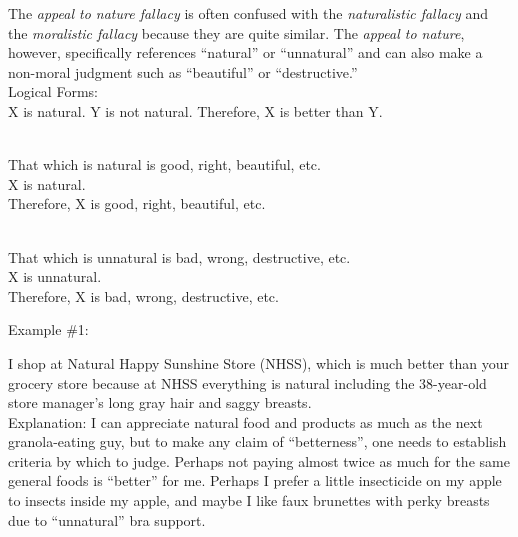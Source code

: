 \documentclass[a4paper,12pt,single,pdftex]{scrartcl}
\begin{document}
    
      The {\it appeal to nature fallacy} is often confused with the {\it naturalistic fallacy} and the {\it moralistic fallacy} because they are quite similar. The {\it appeal to nature}, however, specifically references “natural” or “unnatural” and can also make a non-moral judgment such as “beautiful” or “destructive.”
    \\

    
      Logical Forms:
    \\

    
      X is natural. \newline
Y is not natural. \newline
Therefore, X is better than Y. \newline
 \newline

    \\

    
      That which is natural is good, right, beautiful, etc.
    \\

    
      X is natural.
    \\

    
      Therefore, X is good, right, beautiful, etc. \newline
 \newline

    \\

    
      That which is unnatural is bad, wrong, destructive, etc.
    \\

    
      X is unnatural.
    \\

    
      Therefore, X is bad, wrong, destructive, etc.
    \\

    
       \newline

      Example \#1: \newline
 \newline


      
        I shop at Natural Happy Sunshine Store (NHSS), which is much better than your grocery store because at NHSS everything is natural including the 38-year-old store manager’s long gray hair and saggy breasts.
      \\

      
        Explanation: I can appreciate natural food and products as much as the next granola-eating guy, but to make any claim of “betterness”, one needs to establish criteria by which to judge.  Perhaps not paying almost twice as much for the same general foods is “better” for me.  Perhaps I prefer a little insecticide on my apple to insects inside my apple, and maybe I like faux brunettes with perky breasts due to “unnatural” bra support.
      \\
\end{document}

